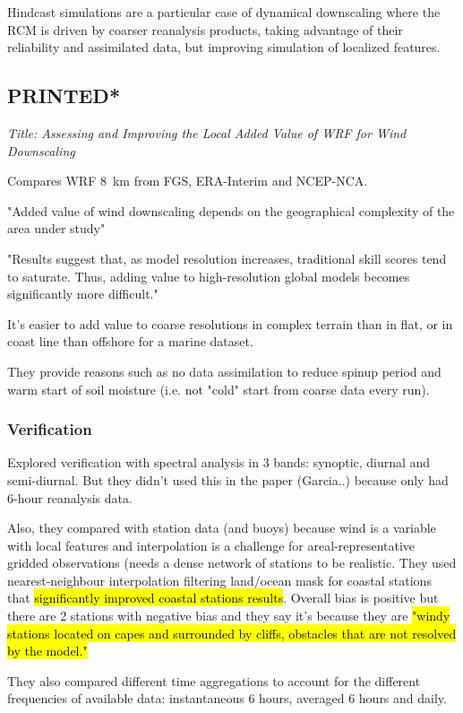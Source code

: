 \documentclass[12pt,a4paper]{article}
\begin{document}
Hindcast simulations are a particular case of dynamical downscaling where the RCM is driven by coarser reanalysis products, taking advantage of their reliability and assimilated data, but improving simulation of localized features.

\subsection{\cite{Garcia-Diez2015} PRINTED*}

\textit{Title: Assessing and Improving the Local Added Value of WRF for Wind Downscaling}

Compares WRF 8~km from FGS, ERA-Interim and NCEP-NCA. 

"Added value of wind downscaling depends on the geographical complexity of the area under study" 

"Results suggest that, as model resolution increases, traditional skill scores tend to saturate. Thus, adding value to high-resolution global models becomes significantly more difficult." 

It's easier to add value to coarse resolutions in complex terrain than in flat, or in coast line than offshore for a marine dataset. 

They provide reasons such as no data assimilation to reduce spinup period and warm start of soil moisture (i.e. not "cold" start from coarse data every run).

\subsubsection{Verification}

Explored verification with spectral analysis in 3 bands: synoptic, diurnal and semi-diurnal. But they didn't used this in the paper (Garcia..) because only had 6-hour reanalysis data.

Also, they compared with station data (and buoys) because wind is a variable with local features and interpolation is a challenge for areal-representative gridded observations (needs a dense network of stations to be realistic. They used nearest-neighbour interpolation filtering land/ocean mask for coastal stations that \hl{significantly improved coastal stations results}. Overall bias is positive but there are 2 stations with negative bias and they say it's because they are \hl{"windy stations located on capes and surrounded by cliffs, obstacles that are not resolved by the model."}

They also compared different time aggregations to account for the different frequencies of available data: instantaneous 6 hours, averaged 6 hours and daily.
\end{document}
